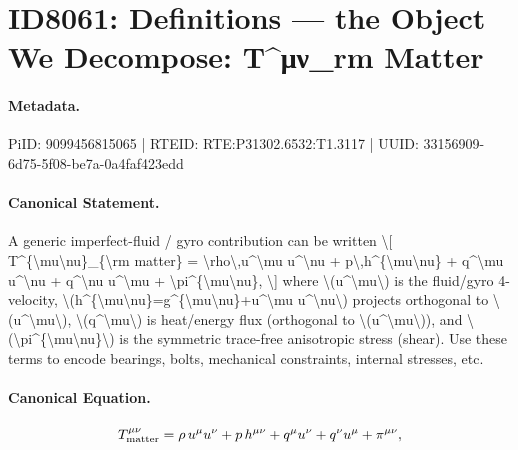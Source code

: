 \section*{ID8061: Definitions — the Object We Decompose: T\textasciicircum{}μν\_rm Matter}
\paragraph{Metadata.}
PiID: 9099456815065 | RTEID: RTE:P31302.6532:T1.3117 | UUID: 33156909-6d75-5f08-be7a-0a4faf423edd

\paragraph{Canonical Statement.}
A generic imperfect-fluid / gyro contribution can be written \textbackslash{}[ T\textasciicircum{}\{\textbackslash{}mu\textbackslash{}nu\}\_\{\textbackslash{}rm matter\} = \textbackslash{}rho\textbackslash{},u\textasciicircum{}\textbackslash{}mu u\textasciicircum{}\textbackslash{}nu + p\textbackslash{},h\textasciicircum{}\{\textbackslash{}mu\textbackslash{}nu\} + q\textasciicircum{}\textbackslash{}mu u\textasciicircum{}\textbackslash{}nu + q\textasciicircum{}\textbackslash{}nu u\textasciicircum{}\textbackslash{}mu + \textbackslash{}pi\textasciicircum{}\{\textbackslash{}mu\textbackslash{}nu\}, \textbackslash{}] where \textbackslash{}(u\textasciicircum{}\textbackslash{}mu\textbackslash{}) is the fluid/gyro 4-velocity, \textbackslash{}(h\textasciicircum{}\{\textbackslash{}mu\textbackslash{}nu\}=g\textasciicircum{}\{\textbackslash{}mu\textbackslash{}nu\}+u\textasciicircum{}\textbackslash{}mu u\textasciicircum{}\textbackslash{}nu\textbackslash{}) projects orthogonal to \textbackslash{}(u\textasciicircum{}\textbackslash{}mu\textbackslash{}), \textbackslash{}(q\textasciicircum{}\textbackslash{}mu\textbackslash{}) is heat/energy flux (orthogonal to \textbackslash{}(u\textasciicircum{}\textbackslash{}mu\textbackslash{})), and \textbackslash{}(\textbackslash{}pi\textasciicircum{}\{\textbackslash{}mu\textbackslash{}nu\}\textbackslash{}) is the symmetric trace-free anisotropic stress (shear). Use these terms to encode bearings, bolts, mechanical constraints, internal stresses, etc.

\paragraph{Canonical Equation.}
\[
T^{\mu\nu}_{\rm matter} = \rho\,u^\mu u^\nu + p\,h^{\mu\nu} + q^\mu u^\nu + q^\nu u^\mu + \pi^{\mu\nu},
\]

